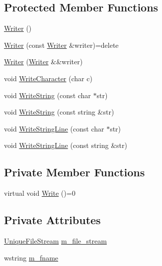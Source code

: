 \subsection*{Protected Member Functions}
\begin{DoxyCompactItemize}
\item 
\hyperlink{classmage_1_1_writer_a40b6cd3005d509e670c5a49272d9ef27}{Writer} ()
\item 
\hyperlink{classmage_1_1_writer_a2b257938508732ca0b78241aafa7922c}{Writer} (const \hyperlink{classmage_1_1_writer}{Writer} \&writer)=delete
\item 
\hyperlink{classmage_1_1_writer_a2581e06e581aed84ee2d3c6a82c7cf58}{Writer} (\hyperlink{classmage_1_1_writer}{Writer} \&\&writer)
\item 
void \hyperlink{classmage_1_1_writer_aa1ef04f5e69c44afda56704c2823316c}{Write\+Character} (char c)
\item 
void \hyperlink{classmage_1_1_writer_abffb25b71fc692db26abfa9dd147874e}{Write\+String} (const char $\ast$str)
\item 
void \hyperlink{classmage_1_1_writer_aaa0e62c04e6ff6c90fa73c64fc48635d}{Write\+String} (const string \&str)
\item 
void \hyperlink{classmage_1_1_writer_ad53f69e0f722c4d4b8b320ea39770c1a}{Write\+String\+Line} (const char $\ast$str)
\item 
void \hyperlink{classmage_1_1_writer_a542963963dc22cdecbdb3a29a3843ee9}{Write\+String\+Line} (const string \&str)
\end{DoxyCompactItemize}
\subsection*{Private Member Functions}
\begin{DoxyCompactItemize}
\item 
virtual void \hyperlink{classmage_1_1_writer_a9baf695ef7f6180bef883f60bcb3ac07}{Write} ()=0
\end{DoxyCompactItemize}
\subsection*{Private Attributes}
\begin{DoxyCompactItemize}
\item 
\hyperlink{namespacemage_a0ee1bd45ad7dbb3dc8c8e1770e3538d4}{Unique\+File\+Stream} \hyperlink{classmage_1_1_writer_ac4884215d1b547e990633474bf61c470}{m\+\_\+file\+\_\+stream}
\item 
wstring \hyperlink{classmage_1_1_writer_afa271ee47897d4961e9d62132d8faeb5}{m\+\_\+fname}
\end{DoxyCompactItemize}


